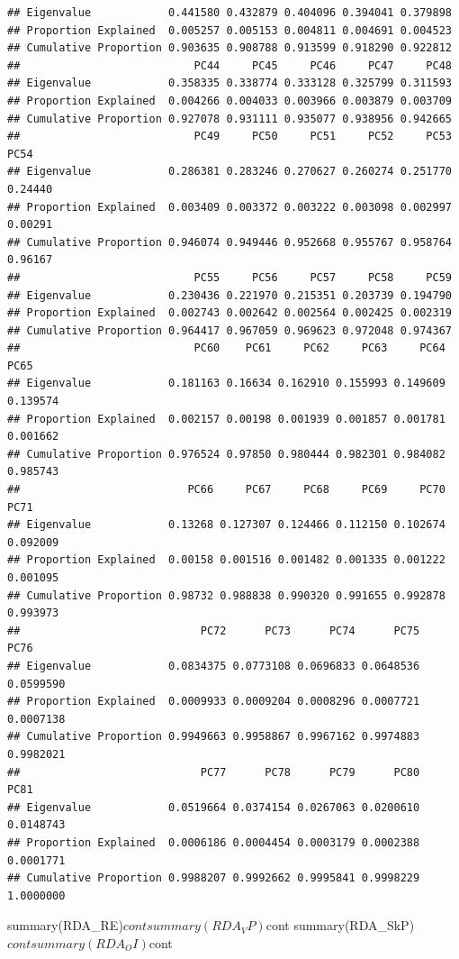 \documentclass[]{article}
\begin{document}
\begin{verbatim}
## Eigenvalue            0.441580 0.432879 0.404096 0.394041 0.379898
## Proportion Explained  0.005257 0.005153 0.004811 0.004691 0.004523
## Cumulative Proportion 0.903635 0.908788 0.913599 0.918290 0.922812
##                           PC44     PC45     PC46     PC47     PC48
## Eigenvalue            0.358335 0.338774 0.333128 0.325799 0.311593
## Proportion Explained  0.004266 0.004033 0.003966 0.003879 0.003709
## Cumulative Proportion 0.927078 0.931111 0.935077 0.938956 0.942665
##                           PC49     PC50     PC51     PC52     PC53    PC54
## Eigenvalue            0.286381 0.283246 0.270627 0.260274 0.251770 0.24440
## Proportion Explained  0.003409 0.003372 0.003222 0.003098 0.002997 0.00291
## Cumulative Proportion 0.946074 0.949446 0.952668 0.955767 0.958764 0.96167
##                           PC55     PC56     PC57     PC58     PC59
## Eigenvalue            0.230436 0.221970 0.215351 0.203739 0.194790
## Proportion Explained  0.002743 0.002642 0.002564 0.002425 0.002319
## Cumulative Proportion 0.964417 0.967059 0.969623 0.972048 0.974367
##                           PC60    PC61     PC62     PC63     PC64     PC65
## Eigenvalue            0.181163 0.16634 0.162910 0.155993 0.149609 0.139574
## Proportion Explained  0.002157 0.00198 0.001939 0.001857 0.001781 0.001662
## Cumulative Proportion 0.976524 0.97850 0.980444 0.982301 0.984082 0.985743
##                          PC66     PC67     PC68     PC69     PC70     PC71
## Eigenvalue            0.13268 0.127307 0.124466 0.112150 0.102674 0.092009
## Proportion Explained  0.00158 0.001516 0.001482 0.001335 0.001222 0.001095
## Cumulative Proportion 0.98732 0.988838 0.990320 0.991655 0.992878 0.993973
##                            PC72      PC73      PC74      PC75      PC76
## Eigenvalue            0.0834375 0.0773108 0.0696833 0.0648536 0.0599590
## Proportion Explained  0.0009933 0.0009204 0.0008296 0.0007721 0.0007138
## Cumulative Proportion 0.9949663 0.9958867 0.9967162 0.9974883 0.9982021
##                            PC77      PC78      PC79      PC80      PC81
## Eigenvalue            0.0519664 0.0374154 0.0267063 0.0200610 0.0148743
## Proportion Explained  0.0006186 0.0004454 0.0003179 0.0002388 0.0001771
## Cumulative Proportion 0.9988207 0.9992662 0.9995841 0.9998229 1.0000000
\end{verbatim}

summary(RDA\_RE)\(cont summary(RDA_VP)\)cont
summary(RDA\_SkP)\(cont summary(RDA_OI)\)cont
\end{document}
